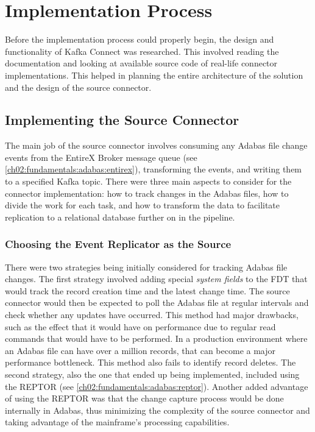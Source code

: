 \section{Implementation Process}
Before the implementation process could properly begin, the design and functionality of Kafka Connect was researched. This involved reading the documentation and looking at available source code of real-life connector implementations. This helped in planning the entire architecture of the solution and the design of the source connector.

\subsection{Implementing the Source Connector}
The main job of the source connector involves consuming any Adabas file change events from the EntireX Broker message queue (see \ref{ch02:fundamentals:adabas:entirex}), transforming the events, and writing them to a specified Kafka topic. There were three main aspects to consider for the connector implementation: how to track changes in the Adabas files, how to divide the work for each task, and how to transform the data to facilitate replication to a relational database further on in the pipeline.

\subsubsection{Choosing the Event Replicator as the Source}
There were two strategies being initially considered for tracking Adabas file changes. The first strategy involved adding special \textit{system fields} to the \ac{FDT} that would track the record creation time and the latest change time. The source connector would then be expected to poll the Adabas file at regular intervals and check whether any updates have occurred. This method had major drawbacks, such as the effect that it would have on performance due to regular read commands that would have to be performed. In a production environment where an Adabas file can have over a million records, that can become a major performance bottleneck. This method also fails to identify record deletes. The second strategy, also the one that ended up being implemented, included using the \ac{REPTOR} (see \ref{ch02:fundamentals:adabas:reptor}). Another added advantage of using the \ac{REPTOR} was that the change capture process would be done internally in Adabas, thus minimizing the complexity of the source connector and taking advantage of the mainframe's processing capabilities.

